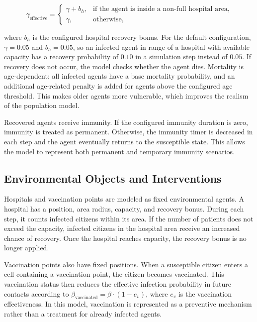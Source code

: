 \documentclass[english]{projectreport}
\begin{document}
\begin{equation}
\gamma_{\mathrm{effective}} =
\begin{cases}
\gamma + b_h, & \text{if the agent is inside a non-full hospital area,}\\
\gamma, & \text{otherwise,}
\end{cases}
\end{equation}

where $b_h$ is the configured hospital recovery bonus. For the default
configuration, $\gamma = 0.05$ and $b_h = 0.05$, so an infected agent in
range of a hospital with available capacity has a recovery probability
of $0.10$ in a simulation step instead of $0.05$. If recovery does not
occur, the model checks whether the agent dies. Mortality is
age-dependent: all infected agents have a base mortality probability,
and an additional age-related penalty is added for agents above the
configured age threshold. This makes older agents more vulnerable, which
improves the realism of the population model.

Recovered agents receive immunity. If the configured immunity duration is
zero, immunity is treated as permanent. Otherwise, the immunity timer is
decreased in each step and the agent eventually returns to the
susceptible state. This allows the model to represent both permanent and
temporary immunity scenarios.

\subsection{Environmental Objects and Interventions}
\label{sec:solution-interventions}

Hospitals and vaccination points are modeled as fixed environmental
agents. A hospital has a position, area radius, capacity, and recovery
bonus. During each step, it counts infected citizens within its area. If
the number of patients does not exceed the capacity, infected citizens in
the hospital area receive an increased chance of recovery. Once the
hospital reaches capacity, the recovery bonus is no longer applied.

Vaccination points also have fixed positions. When a susceptible citizen
enters a cell containing a vaccination point, the citizen becomes
vaccinated. This vaccination status then reduces the effective infection
probability in future contacts according to
$\beta_{\mathrm{vaccinated}} = \beta \cdot (1 - e_v)$, where $e_v$ is
the vaccination effectiveness. In this model, vaccination is represented
as a preventive mechanism rather than a treatment for already infected
agents.
\end{document}
